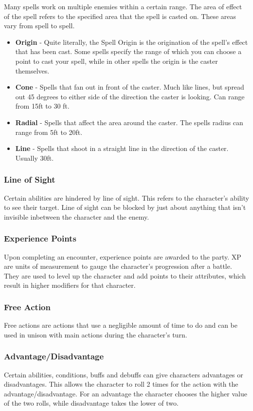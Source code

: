 \documentclass[12pt,a4paper]{report}
\begin{document}
				Many spells work on multiple enemies within a certain range. The area of effect of the spell refers to the specified area that the spell is casted on. These areas vary from spell to spell.
				\begin{itemize}
					\item \textbf{Origin} - Quite literally, the Spell Origin is the origination of the spell's effect that has been cast. Some spells specify the range of which you can choose a point to cast your spell, while in other spells the origin is the caster themselves.
					\item \textbf{Cone} - Spells that fan out in front of the caster. Much like lines, but spread out 45 degrees to either side of the direction the caster is looking. Can range from 15ft to 30 ft.
					\item \textbf{Radial} - Spells that affect the area around the caster. The spells radius can range from 5ft to 20ft.
					\item \textbf{Line} - Spells that shoot in a straight line in the direction of the caster. Usually 30ft.
				\end{itemize}	
				
			\subsubsection{Line of Sight}
				Certain abilities are hindered by line of sight. This refers to the character's ability to see their target. Line of sight can be blocked by just about anything that isn't invisible inbetween the character and the enemy.
			\subsubsection{Experience Points}
				Upon completing an encounter, experience points are awarded to the party. XP are units of measurement to gauge the character's progression after a battle. They are used to level up the character and add points to their attributes, which result in higher modifiers for that character.
			\subsubsection{Free Action}
				Free actions are actions that use a negligible amount of time to do and can be used in unison with main actions during the character's turn.
			\subsubsection{Advantage/Disadvantage}
				Certain abilities, conditions, buffs and debuffs can give characters advantages or disadvantages. This allows the character to roll 2 times for the action with the advantage/disadvantage. For an advantage the character chooses the higher value of the two rolls, while disadvantage takes the lower of two.
\newpage
\end{document}
